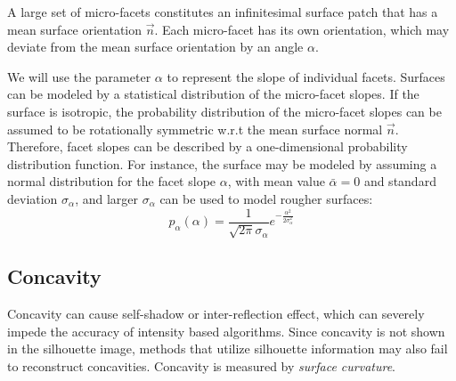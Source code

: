 A large set of micro-facets constitutes an infinitesimal surface patch that has a mean surface orientation $\vec{n}$. Each micro-facet has its own orientation, which may deviate from the mean surface orientation by an angle $\alpha$.

We will use the parameter $\alpha$ to represent the slope of individual facets. Surfaces can be modeled by a statistical distribution of the micro-facet slopes. If the surface is isotropic, the probability distribution of the micro-facet slopes can be assumed to be rotationally symmetric w.r.t the mean surface normal $\vec{n}$.  Therefore, facet slopes can be described by a one-dimensional probability distribution function. For instance, the surface may be modeled by assuming a normal distribution for the facet slope $\alpha$, with mean value $\bar{\alpha}=0$ and standard deviation $\sigma_\alpha$, and larger $\sigma_\alpha$ can be used to model rougher surfaces:
$$
p_\alpha(\alpha)=\frac{1}{\sqrt{2\pi}\sigma_\alpha}e^{-\frac{\alpha^2}{2\sigma_\alpha^2}}
$$



\subsection{Concavity}
Concavity can cause self-shadow or inter-reflection effect, which can severely impede the accuracy of intensity based algorithms. Since concavity is not shown in the silhouette image, methods that utilize silhouette information may also fail to reconstruct concavities. Concavity is measured by \textit{surface curvature}.



